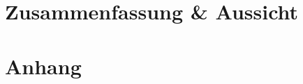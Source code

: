 \documentclass[a4paper, 12pt, parskip=half]{scrbook}
\begin{document}
	\chapter{Zusammenfassung \& Aussicht}
	
	\backmatter 
	\rofoot[\textbf{$\mid$~~\pagemark}]{\textbf{$\mid$~~\pagemark}}
	\lefoot[\textbf{\pagemark~~$\mid$}]{\textbf{\pagemark~~$\mid$}}
	\chapter{Anhang}
	
	\listoffigures
	
	\listoftables
	
	\lstlistoflistings
	
	\printbibliography
	 
	\printindex
	
\end{document}
